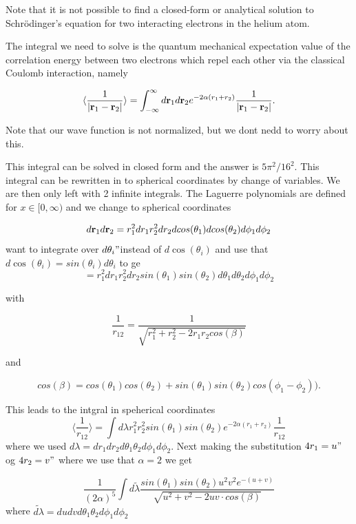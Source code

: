 \documentclass[twoside,twocolumn]{article}
\begin{document}
Note that it is not possible to find a closed-form or analytical
solution to Schr\"odinger's equation for two interacting electrons in
the helium atom.

The integral we need to solve is the quantum mechanical expectation
value of the correlation energy between two electrons which repel each
other via the classical Coulomb interaction, namely

\begin{equation} \label{integral}
   \langle \frac{1}{|{\bf r}_1-{\bf r}_2|} \rangle=\int_{-\infty}^{\infty} d{\bf r}_1d{\bf r}_2  e^{-2\alpha (r_1+r_2)}\frac{1}{|{\bf r}_1-{\bf r}_2|}.
\end{equation}

Note that our wave function is not normalized, but we dont nedd to worry about this.

This integral can be solved in closed form and the answer is
$5\pi^2/16^2$.
This integral can be rewritten in to spherical coordinates by change of variables. We are then only left with 2 infinite integrals. The Laguerre
polynomials are defined for $x\in [0,\infty)$ and we change to
spherical coordinates

\[
   d{\bf r}_1d{\bf r}_2  = r_1^2dr_1 r_2^2dr_2 dcos(\theta_1)dcos(\theta_2)d\phi_1d\phi_2 
\]
want to integrate over $d\theta_i" $instead of $d\cos(\theta_i)$ and use that $d\cos(\theta_i) = sin(\theta_i)d\theta_i$ to ge
\[
= r_1^2dr_1 r_2^2dr_2 sin(\theta_1)sin(\theta_2)d\theta_1d\theta_2d\phi_1d\phi_2
\]

with

\[
   \frac{1}{r_{12}}= \frac{1}{\sqrt{r_1^2+r_2^2-2r_1r_2cos(\beta)}}
\]

and 

\[
cos(\beta) = cos(\theta_1)cos(\theta_2)+sin(\theta_1)sin(\theta_2)cos(\phi_1-\phi_2)).
\]

This leads to the intgral in speherical coordinates
\begin{equation}
	\langle \frac{1}{{r_{12}}} \rangle=\int d\lambda  r_1^2r_2^2sin(\theta_1)sin(\theta_2)e^{-2\alpha (r_1+r_2)}\frac{1}{r_{12}}
\end{equation}
where we used $d\lambda  =dr_1 dr_2d\theta_1\theta_2d\phi_1d\phi_2$. Next making the substitution $4r_1 = u"$ og $4r_2 = v"$ where we use that $\alpha = 2$ we get

\begin{equation}
	\frac{1}{(2\alpha)^5}\int d\tilde{\lambda}  \frac{sin(\theta_1)sin(\theta_2)  u^2v^2e^{-(u+v)}}{\sqrt{u^2+v^2-2uv \cdot cos(\beta)}}
\end{equation} 
where  $\tilde{d\lambda}  =du dvd\theta_1\theta_2d\phi_1d\phi_2$
\end{document}
